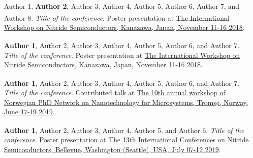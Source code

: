 \begin{enumerate}[wide=0em, leftmargin=*, itemsep=3pt, labelsep=0.5em, widest=99, label={[\arabic*]}]
    \item Author 1, \textbf{Author 2}, Author 3, Author 4, Author 5, Author 6, Author 7, and Author 8\textsuperscript{\textdagger}. \textit{Title of the conference}. \textcolor{sophia}{Poster presentation} at \href{http://web.archive.org/web/20191029062712/http://www.iwn2018.jp/IWN_AP_including_late_news.pdf#page=123}{ The International Workshop on Nitride Semiconductors, Kanazawa, Japan, November 11-16 2018}.
    
    \item \textbf{Author 1}, Author 2, Author 3, Author 4, Author 5, Author 6\textsuperscript{\textdagger}, and Author 7. \textit{Title of the conference}. \textcolor{sophia}{Poster presentation} at \href{http://web.archive.org/web/20191029062712/http://www.iwn2018.jp/IWN_AP_including_late_news.pdf#page=155}{ The International Workshop on Nitride Semiconductors, Kanazawa, Japan, November 11-16 2018}.

    \begin{sloppypar}
    \item \textbf{Author 1\textsuperscript{\textdagger}}, Author 2, Author 3, Author 4, Author 5, Author 6, and Author 7. \textit{Title of the conference}. \textcolor{sophia}{Contributed talk} at \href{http://www.nano-network.net/wp-content/uploads/2019/06/Preliminary-program-Workshop.pdf}{ The 10th annual workshop of Norwegian PhD Network on Nanotechnology for Microsystems, Tromsø, Norway, June 17-19 2019}.
    \end{sloppypar}
    
    \item \textbf{Author 1}, Author 2, Author 3, Author 4, Author 5, and Author 6\textsuperscript{\textdagger}. \textit{Title of the conference}. \textcolor{sophia}{Poster presentation} at \href{https://andreasliudimulyo.github.io/file/past-conferences/icns-13-program-web.pdf#page=9}{The 13th International Conferences on Nitride Semiconductors, Bellevue, Washington (Seattle), USA, July 07-12 2019}.
    
\end{enumerate}